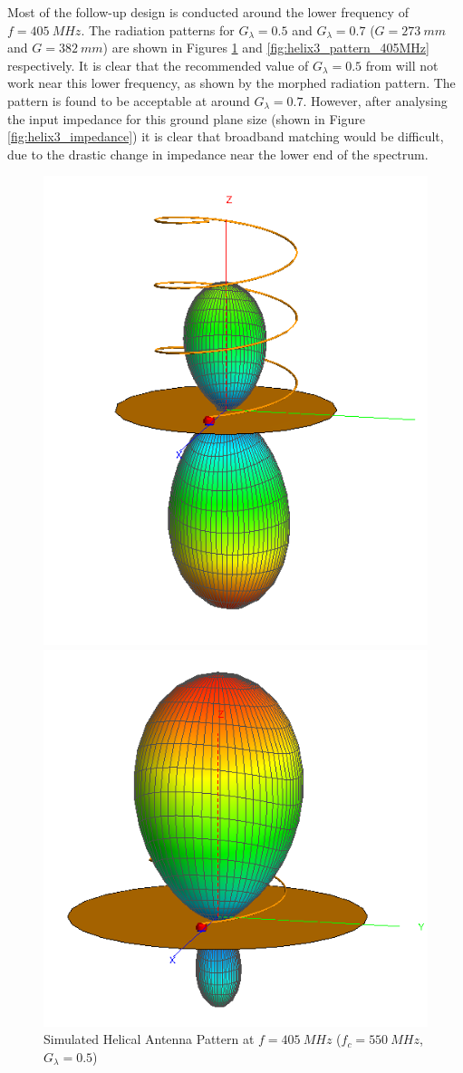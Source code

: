 Most of the follow-up design is conducted around the lower frequency of $f = \SI{405}{MHz}$. The radiation patterns for $G_\lambda = 0.5$ and $G_\lambda = 0.7$ ($G = \SI{273}{mm}$ and $G = \SI{382}{mm}$) are shown in Figures \ref{fig:helix2_pattern_405MHz} and \ref{fig:helix3_pattern_405MHz} respectively. It is clear that the recommended value of $G_\lambda = 0.5$ from \cite{textbook-antennaTheoryAnalysisDesign} will not work near this lower frequency, as shown by the morphed radiation pattern. The pattern is found to be acceptable at around $G_\lambda = 0.7$. However, after analysing the input impedance for this ground plane size (shown in Figure \ref{fig:helix3_impedance}) it is clear that broadband matching would be difficult, due to the drastic change in impedance near the lower end of the spectrum.

\begin{figure}[!htb]
  \begin{minipage}{.48\textwidth}
    \centering
    \includegraphics[width=0.6\linewidth]{helix2_pattern_405MHz}
    \caption{Simulated Helical Antenna Pattern at $f = \SI{405}{MHz}$ ($f_c = \SI{550}{MHz}$, $G_\lambda = 0.5$)}
    \label{fig:helix2_pattern_405MHz}
  \end{minipage}
  \begin{minipage}{.48\textwidth}
    \centering
    \includegraphics[width=0.75\linewidth]{helix3_pattern_405MHz}

\end{minipage}
\end{figure}
